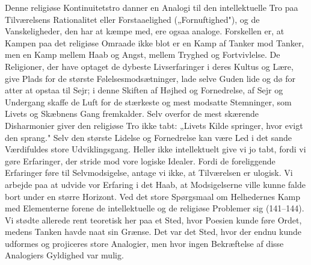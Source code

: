 \documentclass[12pt,a4paper]{book}
\begin{document}
Denne religiøse Kontinuitetstro danner en Analogi til den intellektuelle Tro paa Tilværelsens
Rationalitet eller Forstaaelighed („Fornuftighed"), og de Vanskeligheder, den har at kæmpe
med, ere ogsaa analoge. Forskellen er, at Kampen paa det religiøse Omraade ikke blot er en
Kamp af Tanker mod Tanker, men en Kamp mellem Haab og Angst, mellem Tryghed og Fortvivlelse.
De Religioner, der have optaget de dybeste Livserfaringer i deres Kultus og Lære, give Plads
for de største Følelsesmodsætninger, lade selve Guden lide og dø for atter at opstaa til
Sejr; i denne Skiften af Højhed og Fornedrelse, af Sejr og Undergang skaffe de Luft for de
stærkeste og mest modsatte Stemninger, som Livets og Skæbnens Gang fremkalder. Selv overfor
de mest skærende Disharmonier giver den religiøse Tro ikke tabt: „Livets Kilde springer, hvor
evigt den sprang." Selv den største Lidelse og Fornedrelse kan være Led i det sande
Værdifuldes store Udviklingsgang. Heller ikke intellektuelt give vi jo tabt, fordi vi gøre
Erfaringer, der stride mod vore logiske Idealer. Fordi de foreliggende Erfaringer føre til
Selvmodsigelse, antage vi ikke, at Tilværelsen er ulogisk. Vi arbejde paa at udvide vor
Erfaring i det Haab, at Modsigelserne ville kunne falde bort under en større Horizont. Ved
det store Spørgsmaal om Helhedernes Kamp med Elementerne forene de intellektuelle og de
religiøse Problemer sig (141--144). Vi stødte allerede rent teoretisk her paa et Sted, hvor
Poesien kunde føre Ordet, medens Tanken havde naat sin Grænse. Det var det Sted, hvor der
endnu kunde udformes og projiceres store Analogier, men hvor ingen Bekræftelse af disse
Analogiers Gyldighed var mulig.
\end{document}
